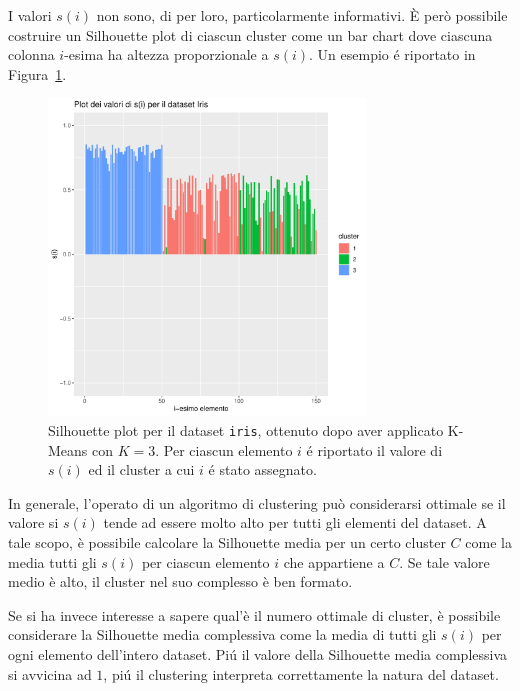 \documentclass[a4paper, 12pt]{report}
\begin{document}
			I valori $s(i)$ non sono, di per loro, particolarmente informativi.
			È però possibile costruire un Silhouette plot di ciascun cluster
			come un bar chart dove ciascuna colonna $i$-esima ha altezza
			proporzionale a $s(i)$. Un esempio é riportato in Figura~\ref{fig:si}.

			\begin{figure}[H]
				\centering
				\includegraphics[width = 0.75\textwidth]{doc/si.pdf}
				\caption{Silhouette plot per il dataset \texttt{iris}, ottenuto
				dopo aver applicato K-Means con $K = 3$. Per ciascun elemento
				$i$ é riportato il valore di $s(i)$ ed il cluster a cui $i$
				é stato assegnato.}
				\label{fig:si}
			\end{figure}

			In generale, l'operato di un algoritmo di clustering può
			considerarsi ottimale se il valore si $s(i)$ tende ad essere
			molto alto per tutti gli elementi del dataset. A tale scopo,
			è possibile calcolare la Silhouette media per un certo cluster
			$C$ come la media tutti gli $s(i)$ per ciascun elemento $i$
			che appartiene a $C$. Se tale valore medio è alto, il cluster
			nel suo complesso è ben formato.

			Se si ha invece interesse a sapere qual'è il numero ottimale
			di cluster, è possibile considerare la Silhouette media
			complessiva come la media di tutti gli $s(i)$ per ogni
			elemento dell'intero dataset. Piú il valore della Silhouette
			media complessiva si avvicina ad $1$, piú il clustering
			interpreta correttamente la natura del dataset.
\end{document}
